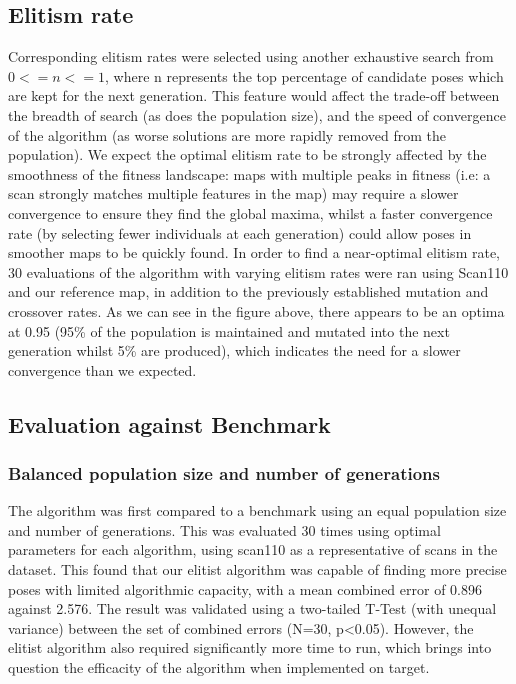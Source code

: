 \documentclass[authoryearcitations]{UoYCSproject}
\begin{document}
\subsection{Elitism rate}
\label{subsec:elite_elitism_rate}
Corresponding elitism rates were selected using another exhaustive search from $0 <= n <= 1$, where n represents the top percentage of candidate poses which are kept for the next generation. This feature would affect the trade-off between the breadth of search (as does the population size), and the speed of convergence of the algorithm (as worse solutions are more rapidly removed from the population). We expect the optimal elitism rate to be strongly affected by the smoothness of the fitness landscape: maps with multiple peaks in fitness (i.e: a scan strongly matches multiple features in the map) may require a slower convergence to ensure they find the global maxima, whilst a faster convergence rate (by selecting fewer individuals at each generation) could allow poses in smoother maps to be quickly found. In order to find a near-optimal elitism rate, 30 evaluations of the algorithm with varying elitism rates were ran using Scan110 and our reference map, in addition to the previously established mutation and crossover rates.
As we can see in the figure above, there appears to be an optima at 0.95 (95\% of the population is maintained and mutated into the next generation whilst 5\% are produced), which indicates the need for a slower convergence than we expected. 

\subsection{Evaluation against Benchmark}
\subsubsection{Balanced population size and number of generations}
\label{subsec:ga_vs_elite_eq_pop_gen}
The algorithm was first compared to a benchmark using an equal population size and number of generations. This was evaluated 30 times using optimal parameters for each algorithm, using scan110 as a representative of scans in the dataset. This found that our elitist algorithm was capable of finding more precise poses with limited algorithmic capacity, with a mean combined error of 0.896 against 2.576. The result was validated using a two-tailed T-Test (with unequal variance) between the set of combined errors (N=30, p<0.05). However, the elitist algorithm also required significantly more time to run, which brings into question the efficacity of the algorithm when implemented on target.
\end{document}
